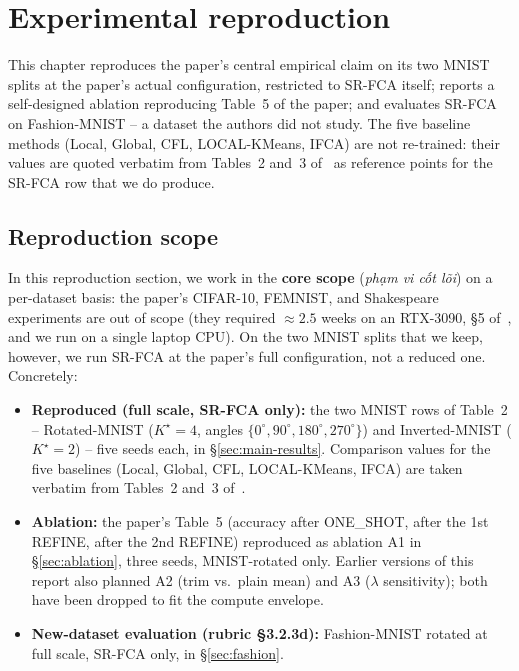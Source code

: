 \chapter{Experimental reproduction}\label{ch:experiments}

This chapter reproduces the paper's central empirical claim on its two MNIST splits at the paper's actual configuration, restricted to SR-FCA itself; reports a self-designed ablation reproducing Table~5 of the paper; and evaluates SR-FCA on Fashion-MNIST -- a dataset the authors did not study. The five baseline methods (Local, Global, CFL, LOCAL-KMeans, IFCA) are not re-trained: their values are quoted verbatim from Tables~2 and~3 of~\parencite{vardhan2024srfca} as reference points for the SR-FCA row that we do produce.

\section{Reproduction scope}\label{sec:repro-scope}

In this reproduction section, we work in the \textbf{core scope} (\textit{phạm vi cốt lõi}) on a per-dataset basis: the paper's CIFAR-10, FEMNIST, and Shakespeare experiments are out of scope (they required $\approx 2.5$ weeks on an RTX-3090, \S 5 of~\parencite{vardhan2024srfca}, and we run on a single laptop CPU). On the two MNIST splits that we keep, however, we run SR-FCA at the paper's full configuration, not a reduced one. Concretely:

\begin{itemize}
    \item \textbf{Reproduced (full scale, SR-FCA only):} the two MNIST rows of Table~2 -- Rotated-MNIST ($K^\star = 4$, angles $\{0^\circ, 90^\circ, 180^\circ, 270^\circ\}$) and Inverted-MNIST ($K^\star = 2$) -- five seeds each, in \S\ref{sec:main-results}. Comparison values for the five baselines (Local, Global, CFL, LOCAL-KMeans, IFCA) are taken verbatim from Tables~2 and~3 of~\parencite{vardhan2024srfca}.
    \item \textbf{Ablation:} the paper's Table~5 (accuracy after ONE\_SHOT, after the 1st REFINE, after the 2nd REFINE) reproduced as ablation A1 in \S\ref{sec:ablation}, three seeds, MNIST-rotated only. Earlier versions of this report also planned A2 (trim vs.\ plain mean) and A3 ($\lambda$ sensitivity); both have been dropped to fit the compute envelope.
    \item \textbf{New-dataset evaluation (rubric §3.2.3d):} Fashion-MNIST rotated at full scale, SR-FCA only, in \S\ref{sec:fashion}.
\end{itemize}

